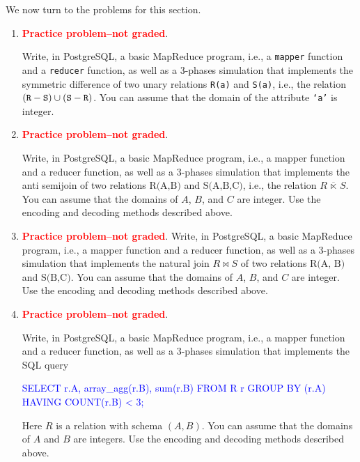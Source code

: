 \documentclass[10pt]{article}
\renewenvironment{alltt}{\vspace{-0.75\baselineskip}\begin{oldalltt}}{\end{oldalltt}\vspace{+0.50\baselineskip}}
\begin{document}
We now turn to the problems for this section.

\begin{enumerate}[resume]
\item \textcolor{red}{\bf Practice problem--not graded}. 

Write, in PostgreSQL, a basic MapReduce program, i.e., a {\tt mapper}
function and a {\tt reducer} function, as well as a 3-phases simulation that
implements the symmetric difference of two unary relations {\tt R(a)} and
{\tt S(a)}, i.e., the relation $({\tt R} - {\tt S})\cup({\tt S}-{\tt R})$.  You can assume that the domain of
the attribute {\tt `a'} is integer.

\item  \textcolor{red}{\bf Practice problem--not graded}. 

Write, in PostgreSQL, a basic MapReduce program, i.e., a mapper function and a reducer function, as well as a 3-phases simulation 
that implements the anti semijoin of two
relations $\text{R(A,B)}$ and $\text{S(A,B,C)}$, i.e., the relation $R\,\overline{\ltimes}\, S$.
You can assume that the domains of $A$, $B$, and $C$ are integer.
Use the encoding and decoding methods described above.

\item\label{join} \textcolor{red}{\bf Practice problem--not graded}. %
 Write, in PostgreSQL, a basic MapReduce program, i.e., a mapper function and a reducer function, as well as a 3-phases simulation 
that implements the natural join $R \bowtie S$ of two relations $\text{R(A, B)}$ and $\text{S(B,C)}$.
You can assume that the domains of $A$, $B$, and $C$ are integer.
Use the encoding and decoding methods described above.

\item  \textcolor{red}{\bf Practice problem--not graded}. 

Write, in PostgreSQL, a basic MapReduce program, i.e., a mapper function and a reducer function, as well as a 3-phases simulation 
that implements the SQL query
\begin{alltt}\textcolor{blue}{
SELECT r.A, array_agg(r.B), sum(r.B)
FROM   R r
GROUP  BY (r.A)
HAVING COUNT(r.B) < 3;
}\end{alltt}
Here $R$ is a relation with schema $(A,B)$.   You can assume that the domains of $A$ and $B$ are integers.
Use the encoding and decoding methods described above.
\end{enumerate}
\end{document}
